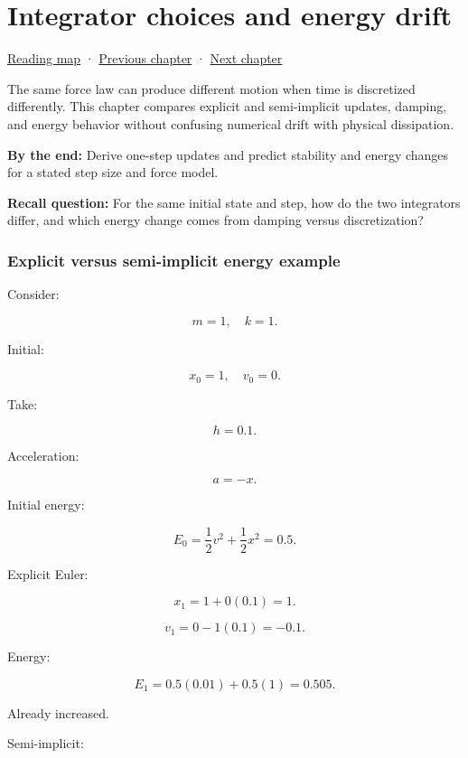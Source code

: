 \hypertarget{06-engine-ii-ch038}{}
\chapter{Integrator choices and energy drift}\label{06-engine-ii-ch038-integrator-choices-and-energy-drift}

\hyperref[volume-reading-map]{Reading map} · \hyperref[06-engine-ii-ch037-physical-examples-and-state-validation]{Previous chapter} · \hyperref[06-engine-ii-ch039-composable-timesteps-and-stable-simulation-policy]{Next chapter}

The same force law can produce different motion when time is discretized differently. This chapter compares explicit and semi-implicit updates, damping, and energy behavior without confusing numerical drift with physical dissipation.

\textbf{By the end:} Derive one-step updates and predict stability and energy changes for a stated step size and force model.

\textbf{Recall question:} For the same initial state and step, how do the two integrators differ, and which energy change comes from damping versus discretization?

\subsection{Explicit versus semi-implicit energy example}\label{06-engine-ii-ch038-explicit-versus-semi-implicit-energy-example}

Consider:

\[
m=1,\quad k=1.
\]

Initial:

\[
x_0=1,\quad v_0=0.
\]

Take:

\[
h=0.1.
\]

Acceleration:

\[
a=-x.
\]

Initial energy:

\[
E_0
=
\frac12v^2+
\frac12x^2
=
0.5.
\]

Explicit Euler:

\[
x_1=1+0(0.1)=1.
\]

\[
v_1=0-1(0.1)=-0.1.
\]

Energy:

\[
E_1
=
0.5(0.01)
+
0.5(1)
=
0.505.
\]

Already increased.

Semi-implicit:

